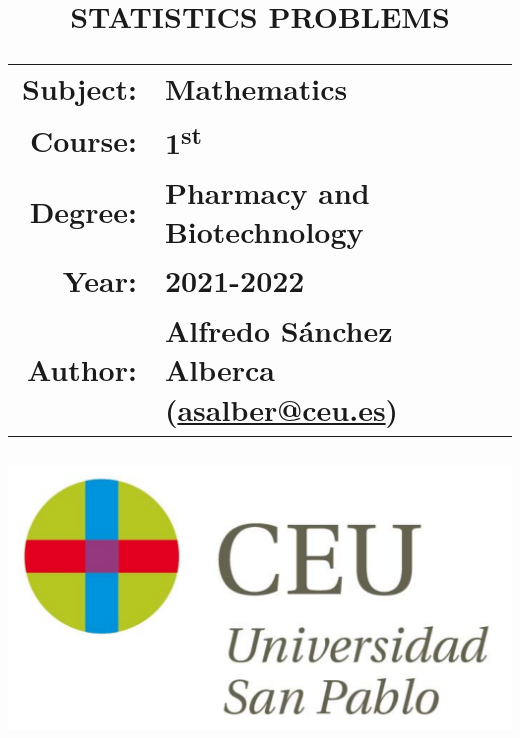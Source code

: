 \documentclass[a4paper,titlepage]{article}
\begin{document}
\sloppy

\title{\vskip 2cm
\Huge \textbf{\textsf{\quad \textcolor{blueceu}{STATISTICS PROBLEMS}\quad}}\\
   \vskip 1cm
\Large \sffamily
\begin{tabular}{rl}
\textcolor{blueceu}{Subject:} & Mathematics\\
\textcolor{blueceu}{Course:} & 1\textsuperscript{st}\\
\textcolor{blueceu}{Degree:} &  Pharmacy and Biotechnology\\
\textcolor{blueceu}{Year:} & 2021-2022\\
\textcolor{blueceu}{Author:} & Alfredo S\'anchez Alberca (\url{asalber@ceu.es})
\end{tabular}
}

\author{}
\date{\includegraphics[scale=0.3]{img/logo_uspceu}}

\maketitle
\newpage
\tableofcontents
\newpage






% 
\end{document}
